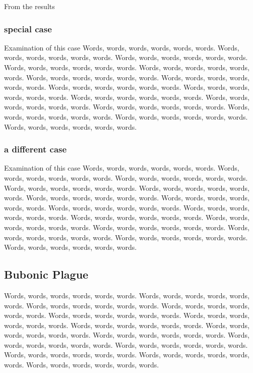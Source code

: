 \documentclass [letterpaper, 12pt] {article}
\begin{document}
From the results 
\pagebreak

\subsubsection{special case}

Examination of this case Words, words, words, words, words, words.  Words, words, words, words, words, words. Words, words, words, words, words, words. Words, words, words, words, words, words. Words, words, words, words, words, words. Words, words, words, words, words, words. Words, words, words, words, words, words. Words, words, words, words, words, words. Words, words, words, words, words, words. Words, words, words, words, words, words. Words, words, words, words, words, words. Words, words, words, words, words, words. Words, words, words, words, words, words. Words, words, words, words, words, words. Words, words, words, words, words, words. 


\pagebreak

\subsubsection{a different case}
Examination of this case Words, words, words, words, words, words.  Words, words, words, words, words, words. Words, words, words, words, words, words. Words, words, words, words, words, words. Words, words, words, words, words, words. Words, words, words, words, words, words. Words, words, words, words, words, words. Words, words, words, words, words, words. Words, words, words, words, words, words. Words, words, words, words, words, words. Words, words, words, words, words, words. Words, words, words, words, words, words. Words, words, words, words, words, words. Words, words, words, words, words, words. Words, words, words, words, words, words. 

\pagebreak

\subsection {Bubonic Plague}

Words, words, words, words, words, words. Words, words, words, words, words, words. Words, words, words, words, words, words. Words, words, words, words, words, words. Words, words, words, words, words, words. Words, words, words, words, words, words. Words, words, words, words, words, words. Words, words, words, words, words, words. Words, words, words, words, words, words. Words, words, words, words, words, words. Words, words, words, words, words, words. Words, words, words, words, words, words. Words, words, words, words, words, words. Words, words, words, words, words, words. 
\end{document}
